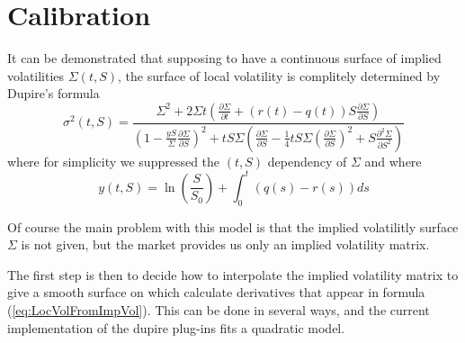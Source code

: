 \section{Calibration}

It can be demonstrated that supposing to have a continuous surface of implied volatilities $\Sigma(t,S)$, the surface of local volatility is complitely determined by Dupire's formula
\begin{equation}\label{eq:LocVolFromImpVol}
\sigma^2(t, S) = \frac{ \Sigma^2 + 2\Sigma t (\frac{\partial\Sigma}{\partial t} + (r(t) - q(t))S\frac{\partial\Sigma}{\partial S} ) }{ \left( 1- \frac{yS}{\Sigma} \frac{\partial\Sigma}{\partial S} \right)^2 + tS\Sigma\left( \frac{\partial\Sigma}{\partial S} - \frac{1}{4} tS\Sigma \left(\frac{\partial\Sigma}{\partial S}\right)^2 + S\frac{\partial^2\Sigma}{\partial S^2} \right) }
\end{equation}
where for simplicity we suppressed the $(t,S)$ dependency of $\Sigma$ and where
\begin{equation}
y(t,S) = \ln\left( \frac{S}{S_0} \right) + \int_{0}^t(q(s) - r(s))ds
\end{equation}

Of course the main problem with this model is that the implied volatilitly surface $\Sigma$ is not given, but the market provides us only an implied volatility matrix.

The first step is then to decide how to interpolate the implied volatility matrix to give a smooth surface on which calculate derivatives that appear in formula (\ref{eq:LocVolFromImpVol}). This can be done in several ways, and the current implementation of the dupire plug-ins fits a quadratic model.






